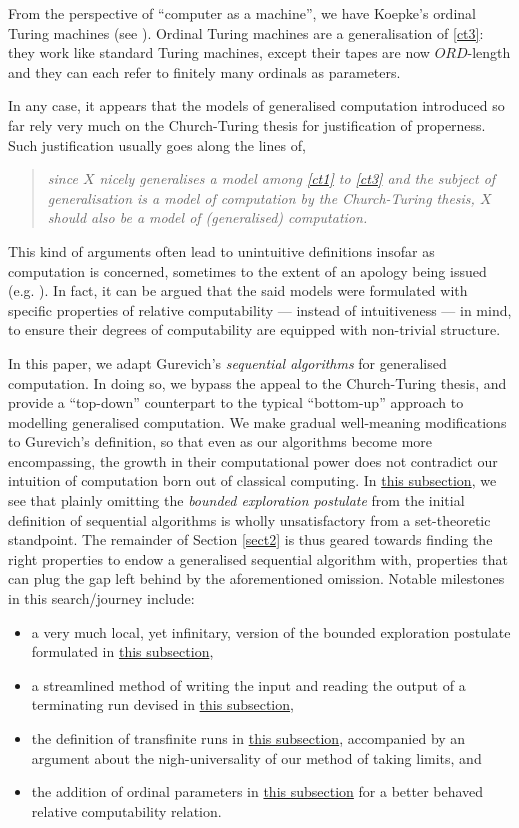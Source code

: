 \documentclass[12pt, twoside]{memoir}
\numberwithin{equation}{section}
\theoremstyle{definition}
\theoremstyle{remark}
\theoremstyle{definition}
\theoremstyle{definition}
\theoremstyle{definition}
\theoremstyle{remark}
\begin{document}
From the perspective of ``computer as a machine'', we have Koepke's ordinal Turing machines (see \cite{koepke1}). Ordinal Turing machines are a generalisation of \ref{ct3}: they work like standard Turing machines, except their tapes are now $ORD$-length and they can each refer to finitely many ordinals as parameters. 

In any case, it appears that the models of generalised computation introduced so far rely very much on the Church-Turing thesis for justification of properness. Such justification usually goes along the lines of,
\begin{quote}
    \emph{since $X$ nicely generalises a model among \ref{ct1} to \ref{ct3} and the subject of generalisation is a model of computation by the Church-Turing thesis, $X$ should also be a model of (generalised) computation.}
\end{quote}
This kind of arguments often lead to unintuitive definitions insofar as computation is concerned, sometimes to the extent of an apology being issued (e.g. \cite{sackserec}). In fact, it can be argued that the said models were formulated with specific properties of relative computability --- instead of intuitiveness --- in mind, to ensure their degrees of computability are equipped with non-trivial structure. 

In this paper, we adapt Gurevich's \textit{sequential algorithms} for generalised computation. In doing so, we bypass the appeal to the Church-Turing thesis, and provide a ``top-down'' counterpart to the typical ``bottom-up'' approach to modelling generalised computation. We make gradual well-meaning modifications to Gurevich's definition, so that even as our algorithms become more encompassing, the growth in their computational power does not contradict our intuition of computation born out of classical computing. In \hyperref[ss210]{this subsection}, we see that plainly omitting the \textit{bounded exploration postulate} from the initial definition of sequential algorithms is wholly unsatisfactory from a set-theoretic standpoint. The remainder of Section \ref{sect2} is thus geared towards finding the right properties to endow a generalised sequential algorithm with, properties that can plug the gap left behind by the aforementioned omission. Notable milestones in this search/journey include:
\begin{itemize}
    \item a very much local, yet infinitary, version of the bounded exploration postulate formulated in \hyperref[ss240]{this subsection},
    \item a streamlined method of writing the input and reading the output of a terminating run devised in \hyperref[ss250]{this subsection},
    \item the definition of transfinite runs in \hyperref[ss270]{this subsection}, accompanied by an argument about the nigh-universality of our method of taking limits, and
    \item the addition of ordinal parameters in \hyperref[ss320]{this subsection} for a better behaved relative computability relation.
\end{itemize}
\end{document}
